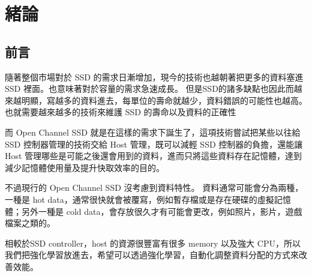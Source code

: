 \chapter{緒論}
\section{前言}
\indent
隨著整個市場對於 SSD 的需求日漸增加，現今的技術也越朝著把更多的資料塞進 SSD 裡面。也意味著對於容量的需求急速成長。
但是SSD的諸多缺點也因此而越來越明顯，寫越多的資料進去，每單位的壽命就越少，資料錯誤的可能性也越高。
也就需要越來越多的技術來維護 SSD 的壽命以及資料的正確性

而 Open Channel SSD 就是在這樣的需求下誕生了，這項技術嘗試把某些以往給 SSD 控制器管理的技術交給 Host 管理，既可以減輕 SSD 控制器的負擔，還能讓 Host 管理哪些是可能之後還會用到的資料，進而只將這些資料存在記憶體，達到減少記憶體使用量及提升快取效率的目的。

不過現行的 Open Channel SSD 沒考慮到資料特性。
資料通常可能會分為兩種，一種是 hot data，通常很快就會被覆寫，例如暫存檔或是存在硬碟的虛擬記憶體；另外一種是 cold data，會存放很久才有可能會更改，例如照片，影片，遊戲檔案之類的。

相較於SSD controller，host 的資源很豐富有很多 memory 以及強大 CPU，所以我們把強化學習放進去，希望可以透過強化學習，自動化調整資料分配的方式來改善效能。



